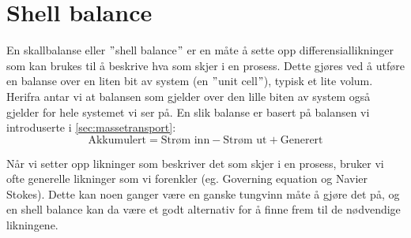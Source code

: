 \clearpage
\section{Shell balance}\label{sec:shell_balance}
En skallbalanse eller $"$shell balance$"$ er en måte å sette opp differensiallikninger som kan brukes til å beskrive hva som skjer i en prosess. Dette gjøres ved å utføre en balanse over en liten bit av system (en $"$unit cell$"$), typisk et lite volum. Herifra antar vi at balansen som gjelder over den lille biten av system også gjelder for hele systemet vi ser på. En slik balanse er basert på balansen vi introduserte i \cref{sec:massetransport}:
\begin{equation}
    \label{eq:gen_balance}
    \text{Akkumulert} = \text{Strøm inn} - \text{Strøm ut} + \text{Generert}
\end{equation}

Når vi setter opp likninger som beskriver det som skjer i en prosess, bruker vi ofte generelle likninger som vi forenkler (eg. Governing equation og Navier Stokes). Dette kan noen ganger være en ganske tungvinn måte å gjøre det på, og en shell balance kan da være et godt alternativ for å finne frem til de nødvendige likningene. 


